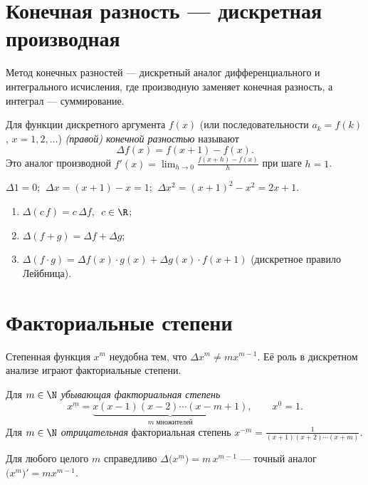 \section{Конечная разность — дискретная производная}

Метод конечных разностей — дискретный аналог дифференциального и интегрального исчисления, где
производную заменяет конечная разность, а интеграл — суммирование.

\begin{definition}
Для функции дискретного аргумента $f(x)$ (или последовательности $a_k=f(k)$, $x=1,2,\dots$)
\emph{(правой) конечной разностью} называют
\[
  \Delta f(x)=f(x+1)-f(x).
\]
Это аналог производной $f'(x)=\lim_{h\to0}\frac{f(x+h)-f(x)}{h}$ при шаге $h=1$.
\end{definition}

\begin{example}
$\Delta 1=0$; $\ \Delta x=(x+1)-x=1$; $\ \Delta x^2=(x+1)^2-x^2=2x+1$.
\end{example}

\begin{property}\leavevmode
\begin{enumerate}[label=\arabic*),leftmargin=*]
  \item $\Delta(c\,f)=c\,\Delta f$, $\ c\in\R$;
  \item $\Delta(f+g)=\Delta f+\Delta g$;
  \item $\Delta(f\cdot g)=\Delta f(x)\cdot g(x)+\Delta g(x)\cdot f(x+1)$ (дискретное правило Лейбница).
\end{enumerate}
\end{property}

\section{Факториальные степени}

Степенная функция $x^m$ неудобна тем, что $\Delta x^m\ne mx^{m-1}$. Её роль в дискретном анализе
играют факториальные степени.

\begin{definition}
Для $m\in\N$ \emph{убывающая факториальная степень}
\[
  x^{\underline{m}}=\underbrace{x(x-1)(x-2)\cdots(x-m+1)}_{m\text{ множителей}},\qquad
  x^{\underline 0}=1 .
\]
Для $m\in\N$ \emph{отрицательная} факториальная степень
$\displaystyle x^{\underline{-m}}=\frac{1}{(x+1)(x+2)\cdots(x+m)}$.
\end{definition}

\begin{theorem}
Для любого целого $m$ справедливо $\Delta\bigl(x^{\underline m}\bigr)=m\,x^{\underline{m-1}}$ —
точный аналог $\bigl(x^m\bigr)'=mx^{m-1}$.
\end{theorem}

